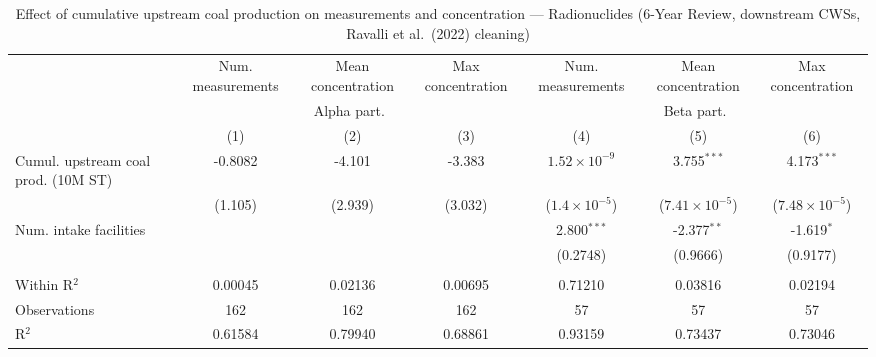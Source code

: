 
\begin{table}[htbp]
   
   \caption{\label{tab:6yr_huc02fe_cnt_radio_ravalli} Effect of cumulative upstream coal production on measurements and concentration --- Radionuclides (6-Year Review, downstream CWSs, Ravalli et al.~(2022) cleaning)}
   \bigskip
   
   \centering
   
   \begin{adjustbox}{width = \textwidth, center}
      
      
      \begin{tabular}{lcccccc}
         \toprule
         
                                             & Num. measurements & Mean concentration & Max concentration & Num. measurements      & Mean concentration      & Max concentration\\  
         
          & \multicolumn{3}{c}{Alpha part.} & \multicolumn{3}{c}{Beta part.} \\ 
         
                                             & (1)               & (2)                & (3)               & (4)                    & (5)                     & (6)\\  
         
         \midrule 
         Cumul. upstream coal prod. (10M ST) & -0.8082           & -4.101             & -3.383            & $1.52\times 10^{-9}$   & 3.755$^{***}$           & 4.173$^{***}$\\   
                                             & (1.105)           & (2.939)            & (3.032)           & ($1.4\times 10^{-5}$)  & ($7.41\times 10^{-5}$)  & ($7.48\times 10^{-5}$)\\    
         Num. intake facilities              &                   &                    &                   & 2.800$^{***}$          & -2.377$^{**}$           & -1.619$^{*}$\\   
                                             &                   &                    &                   & (0.2748)               & (0.9666)                & (0.9177)\\   
         
          \\
         
         Within R$^2$                        & 0.00045           & 0.02136            & 0.00695           & 0.71210                & 0.03816                 & 0.02194\\  
         Observations                        & 162               & 162                & 162               & 57                     & 57                      & 57\\  
         R$^2$                               & 0.61584           & 0.79940            & 0.68861           & 0.93159                & 0.73437                 & 0.73046\\  
         

\end{tabular}
\end{adjustbox}
\end{table}
